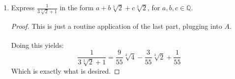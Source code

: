 \documentclass[12pt]{article}
\newenvironment{ex}[2][Exercise]{\begin{trivlist}
\item[\hskip \labelsep {\bfseries #1}\hskip \labelsep {\bfseries #2.}]}{\end{trivlist}}
\begin{document}
\begin{ex}{4}
\begin{enumerate}[label=(\alph*)]
\begin{proof}
    \end{proof}
    \item Express $\frac{1}{3\sqrt[3]{2} + 1}$ in the form $a + b\sqrt[3]{2} + c\sqrt[3]{2}$, for $a, b, c \in \mathbb{Q}$.
    \begin{proof}
        This is just a routine application of the last part, plugging into $A$. \\ \\
        Doing this yields:
        \begin{equation}
            \frac{1}{3\sqrt[3]{2} + 1} = \frac{9}{55}\sqrt[3]{4} - \frac{3}{55} \sqrt[3]{2} + \frac{1}{55}
        \end{equation}
        Which is exactly what is desired.
    \end{proof}
    \end{enumerate}
\end{ex}
\end{document}
